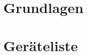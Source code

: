 \documentclass[ngerman]{scrartcl}
\begin{document}
\section[Grundlagen]{Grundlagen \cite{ref:angabe}}
\label{sec:grundlagen}






\section{Geräteliste}
\label{sec:geraeteliste}
\end{document}
